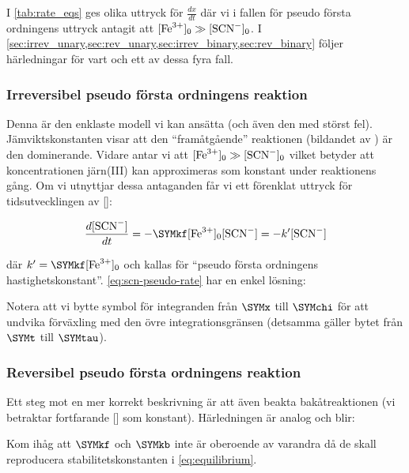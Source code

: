 

I \cref{tab:rate_eqs} ges olika uttryck för $\frac{dx}{dt}$ där vi i
fallen för pseudo första ordningens uttryck antagit att $[\ce{Fe^3+}]_0
\gg [\ce{SCN-}]_0$. I
\cref{sec:irrev_unary,sec:rev_unary,sec:irrev_binary,sec:rev_binary}
följer härledningar för vart och ett av dessa fyra fall.


\subsubsection{Irreversibel pseudo första ordningens reaktion}
\label{sec:irrev_unary}
Denna är den enklaste modell vi kan ansätta (och även den med störst fel).
Jämviktskonstanten visar att den ``framåtgående'' reaktionen (bildandet av )
är den dominerande. Vidare antar vi att $[\ce{Fe^3+}]_0 \gg [\ce{SCN-}]_0$ vilket
betyder att koncentrationen järn(III) kan approximeras som konstant under
reaktionens gång. Om vi utnyttjar dessa antaganden får vi ett förenklat
uttryck för tidsutvecklingen av []:

\begin{equation}
  \label{eq:scn-pseudo-rate}
  \frac{d[\ce{SCN-}]}{dt} = -\SYMkf[\ce{Fe^3+}]_0[\ce{SCN-}] = -k'[\ce{SCN-}]
\end{equation}

där $k' = \SYMkf[\ce{Fe^3+}]_0$ och kallas för ``pseudo första ordningens
hastighetskonstant''. \cref{eq:scn-pseudo-rate} har en enkel lösning:



Notera att vi bytte symbol för integranden från $\SYMx$ till $\SYMchi$ för att
undvika förväxling med den övre integrationsgränsen (detsamma gäller
bytet från $\SYMt$ till $\SYMtau$).

\subsubsection{Reversibel pseudo första ordningens reaktion}
\label{sec:rev_unary}
Ett steg mot en mer korrekt beskrivning är att även beakta
bakåtreaktionen (vi betraktar fortfarande [] som
konstant). Härledningen är analog och blir:


Kom ihåg att $\SYMkf$ och $\SYMkb$ inte är oberoende av varandra då de skall reproducera
stabilitetskonstanten i \cref{eq:equilibrium}.

